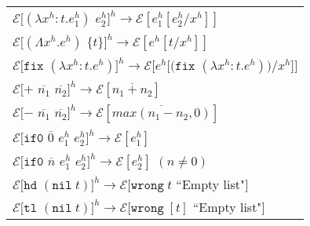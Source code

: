 \begin{figure}[p]
\centering
\begin{tabular}{l}

$\mathscr{E}[(\lambda x^h:t.e^h_1)$ $e^h_2]^h\rightarrow\mathscr{E}[e^h_1[e^h_2/x^h]]$ \\


$\mathscr{E}[(\Lambda x^h.e^h)$ $\lbrace t\rbrace]^h\rightarrow\mathscr{E}[e^h[t/x^h]]$ \\


$\mathscr{E}[\mathtt{fix}$ $(\lambda x^h:t.e^h)]^h\rightarrow\mathscr{E}[e^h[(\mathtt{fix}$ $(\lambda x^h:t.e^h))/x^h]]$ \\


$\mathscr{E}[+$ $\overline{n_1}$ $\overline{n_2}]^h\rightarrow\mathscr{E}[\overline{n_1+n_2}]$ \\


$\mathscr{E}[-$ $\overline{n_1}$ $\overline{n_2}]^h\rightarrow\mathscr{E}[\overline{max(n_1-n_2,0)}]$ \\


$\mathscr{E}[\mathtt{if0}$ $\overline{0}$ $e^h_1$ $e^h_2]^h\rightarrow\mathscr{E}[e^h_1]$ \\


$\mathscr{E}[\mathtt{if0}$ $\overline{n}$ $e^h_1$ $e^h_2]^h\rightarrow\mathscr{E}[e^h_2]$ $(n\neq0)$ \\


$\mathscr{E}[\mathtt{hd}$ $(\mathtt{nil}\;t)]^h\rightarrow\mathscr{E}[\mathtt{wrong}\;t$ ``Empty list"$]$ \\


$\mathscr{E}[\mathtt{tl}$ $(\mathtt{nil}\;t)]^h\rightarrow\mathscr{E}[\mathtt{wrong}\;[t]$ ``Empty list"$]$ \\


\end{tabular}
\end{figure}
